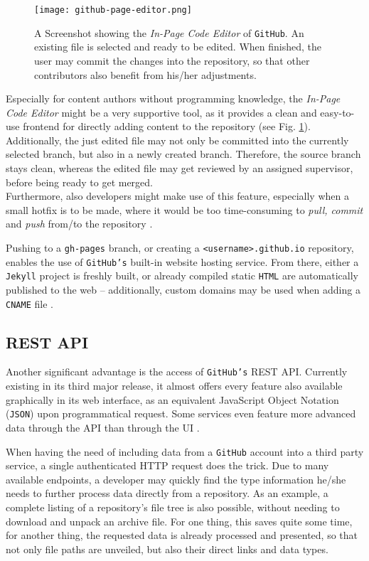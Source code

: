 \begin{figure} %
    \centering
    \texttt{[image: github-page-editor.png]}
    \caption{A Screenshot showing the \emph{In-Page Code Editor} of \texttt{GitHub}. An existing file is selected and ready to be edited. When finished, the user may commit the changes into the repository, so that other contributors also benefit from his/her adjustments.}
    \label{fig:github-page-editor}
\end{figure}
%

Especially for content authors without programming knowledge, the \emph{In-Page Code Editor} might be a very supportive tool, as it provides a clean and easy-to-use frontend for directly adding content to the repository (see Fig. \ref{fig:github-page-editor}). Additionally, the just edited file may not only be committed into the currently selected branch, but also in a newly created branch. Therefore, the source branch stays clean, whereas the edited file may get reviewed by an assigned supervisor, before being ready to get merged.\\
Furthermore, also developers might make use of this feature, especially when a small hotfix is to be made, where it would be too time-consuming to \emph{pull, commit} and \emph{push} from/to the repository \cite[405]{loeliger2012version}.

Pushing to a \texttt{gh-pages} branch, or creating a \texttt{<username>.github.io} repository, enables the use of \texttt{GitHub's} built-in website hosting service. From there, either a \texttt{Jekyll} project is freshly built, or already compiled static \texttt{HTML} are automatically published to the web -- additionally, custom domains may be used when adding a \texttt{CNAME} file \cite[p. 171f]{dhillon2016}.

\subsection{REST API}
Another significant advantage is the access of \texttt{GitHub's} REST API. Currently existing in its third major release, it almost offers every feature also available graphically in its web interface, as an equivalent JavaScript Object Notation (\texttt{JSON}) upon programmatical request. Some services even feature more advanced data through the API than through the UI \cite[410]{loeliger2012version}.

When having the need of including data from a \texttt{GitHub} account into a third party service, a single authenticated HTTP request does the trick. Due to many available endpoints, a developer may quickly find the type information he/she needs to further process data directly from a repository. As an example, a complete listing of a repository's file tree is also possible, without needing to download and unpack an archive file. For one thing, this saves quite some time, for another thing, the requested data is already processed and presented, so that not only file paths are unveiled, but also their direct links and data types.

